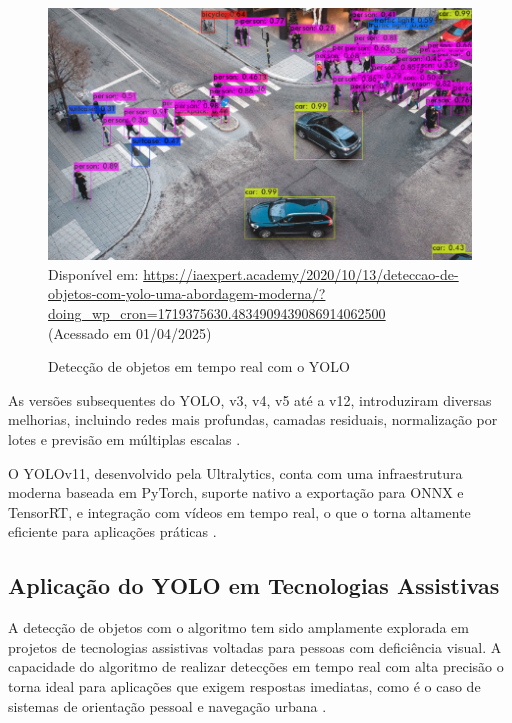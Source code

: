 \begin{figure}[htbp]
  \centering
  \caption{Detecção de objetos em tempo real com o YOLO}
  \includegraphics[width=1\textwidth]{Figuras/detec-yolo.png}
  \\
  Disponível em: \url{https://iaexpert.academy/2020/10/13/deteccao-de-objetos-com-yolo-uma-abordagem-moderna/?doing_wp_cron=1719375630.4834909439086914062500 } \\(Acessado em 01/04/2025)
  \label{fg2}
\end{figure}

As versões subsequentes do YOLO, v3, v4, v5 até a v12, introduziram diversas melhorias, incluindo redes mais profundas, camadas residuais, normalização por lotes e previsão em múltiplas escalas \cite{bochkovskiy2020}.

O YOLOv11, desenvolvido pela Ultralytics, conta com uma infraestrutura moderna baseada em PyTorch, suporte nativo a exportação para ONNX e TensorRT, e integração com vídeos em tempo real, o que o torna altamente eficiente para aplicações práticas \cite{Ultralytics2024}.

\subsection{\textbf{Aplicação do YOLO em Tecnologias Assistivas}}

A detecção de objetos com o algoritmo tem sido amplamente explorada em projetos de tecnologias assistivas voltadas para pessoas com deficiência visual. A capacidade do algoritmo de realizar detecções em tempo real com alta precisão o torna ideal para aplicações que exigem respostas imediatas, como é o caso de sistemas de orientação pessoal e navegação urbana \cite{redmon2016}.

